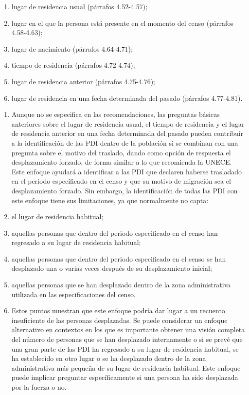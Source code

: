 \documentclass[
]{book}
\begin{document}
\begin{enumerate}
\def\labelenumi{(\arabic{enumi})}
\item
  lugar de residencia usual (párrafos 4.52-4.57);
\item
  lugar en el que la persona está presente en el momento del censo (párrafos 4.58-4.63);
\item
  lugar de nacimiento (párrafos 4.64-4.71);
\item
  tiempo de residencia (párrafos 4.72-4.74);
\item
  lugar de residencia anterior (párrafos 4.75-4.76);
\item
  lugar de residencia en una fecha determinada del pasado (párrafos 4.77-4.81).
\end{enumerate}

\begin{enumerate}
\def\labelenumi{\arabic{enumi}.}
\item
  Aunque no se especifica en las recomendaciones, las preguntas básicas anteriores sobre el lugar de residencia usual, el tiempo de residencia y el lugar de residencia anterior en una fecha determinada del pasado pueden contribuir a la identificación de las PDI dentro de la población si se combinan con una pregunta sobre el motivo del traslado, dando como opción de respuesta el desplazamiento forzado, de forma similar a lo que recomienda la UNECE. Este enfoque ayudará a identificar a las PDI que declaren haberse trasladado en el periodo especificado en el censo y que su motivo de migración sea el desplazamiento forzado. Sin embargo, la identificación de todas las PDI con este enfoque tiene sus limitaciones, ya que normalmente no capta:
\item
  el lugar de residencia habitual;
\item
  aquellas personas que dentro del periodo especificado en el censo han regresado a su lugar de residencia habitual;
\item
  aquellas personas que dentro del periodo especificado en el censo se han desplazado una o varias veces después de su desplazamiento inicial;
\item
  aquellas personas que se han desplazado dentro de la zona administrativa utilizada en las especificaciones del censo.
\item
  Estos puntos muestran que este enfoque podría dar lugar a un recuento insuficiente de las personas desplazadas. Se puede considerar un enfoque alternativo en contextos en los que es importante obtener una visión completa del número de personas que se han desplazado internamente o si se prevé que una gran parte de las PDI ha regresado a su lugar de residencia habitual, se ha establecido en otro lugar o se ha desplazado dentro de la zona administrativa más pequeña de su lugar de residencia habitual. Este enfoque puede implicar preguntar específicamente si una persona ha sido desplazada por la fuerza o no.

\end{enumerate}
\end{document}
